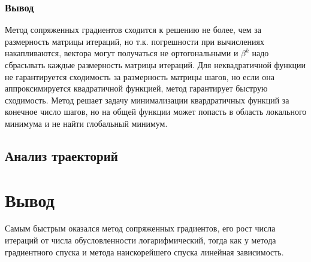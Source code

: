 \subsubsection{Вывод}
Метод сопряженных градиентов сходится к решению не более, чем за {размерность матрицы} итераций, но т.к. погрешности при вычислениях накапливаются, вектора могут получаться не ортогональными и $\beta^k$ надо сбрасывать каждые {размерность матрицы} итераций.
Для неквадратичной функции не гарантируется сходимость за {размерность матрицы} шагов, но если она аппроксимируется квадратичной функцией, метод гарантирует быструю сходимость.
Метод решает задачу минимализации квардратичных функций за конечное число шагов, но на общей функции может попасть в область локального минимума и не найти глобальный минимум.
\newpage

\subsection{Анализ траекторий}\label{subsec:анализ-траекторий}
\newpage


\section{Вывод}\label{sec:вывод}
\newline
Самым быстрым оказался метод сопряженных градиентов, его рост числа итераций от числа обусловленности логарифмический, тогда как у метода градиентного спуска и метода наискорейшего спуска линейная зависимость.
